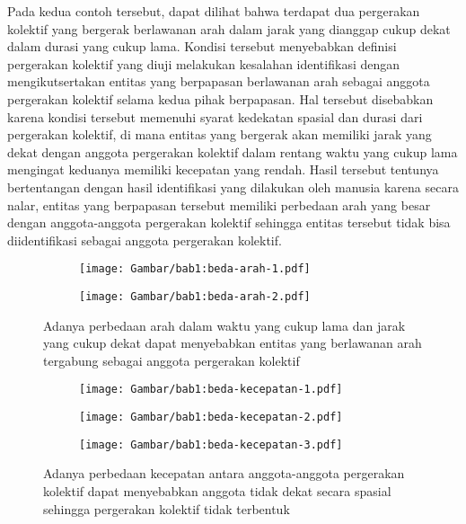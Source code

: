 Pada kedua contoh tersebut, dapat dilihat bahwa terdapat dua pergerakan kolektif yang bergerak berlawanan arah dalam jarak yang dianggap cukup dekat dalam durasi yang cukup lama. Kondisi tersebut menyebabkan definisi pergerakan kolektif yang diuji melakukan kesalahan identifikasi dengan mengikutsertakan entitas yang berpapasan berlawanan arah sebagai anggota pergerakan kolektif selama kedua pihak berpapasan. Hal tersebut disebabkan karena kondisi tersebut memenuhi syarat kedekatan spasial dan durasi dari pergerakan kolektif, di mana entitas yang bergerak akan memiliki jarak yang dekat dengan anggota pergerakan kolektif dalam rentang waktu yang cukup lama mengingat keduanya memiliki kecepatan yang rendah. Hasil tersebut tentunya bertentangan dengan hasil identifikasi yang dilakukan oleh manusia karena secara nalar, entitas yang berpapasan tersebut memiliki perbedaan arah yang besar dengan anggota-anggota pergerakan kolektif sehingga entitas tersebut tidak bisa diidentifikasi sebagai anggota pergerakan kolektif.

\begin{figure}[t]
    \centering
    \captionsetup{width=0.85\textwidth}
    \begin{subfigure}[h]{0.45\textwidth}
        \centering
        \texttt{[image: Gambar/bab1:beda-arah-1.pdf]}
    \end{subfigure} \hspace{0.25cm}
    \begin{subfigure}[h]{0.45\textwidth}
        \centering
        \texttt{[image: Gambar/bab1:beda-arah-2.pdf]}
    \end{subfigure}
    \caption[Masalah perbedaan arah pada identifikasi pergerakan kolektif]{Adanya perbedaan arah dalam waktu yang cukup lama dan jarak yang cukup dekat dapat menyebabkan entitas yang berlawanan arah tergabung sebagai anggota pergerakan kolektif}
    \label{bab1:beda-arah}
\end{figure}

\begin{figure}[t]
    \centering
    \captionsetup{width=0.75\textwidth}
    \begin{subfigure}[h]{0.25\textwidth}
        \centering
        \texttt{[image: Gambar/bab1:beda-kecepatan-1.pdf]}
    \end{subfigure}
    \begin{subfigure}[h]{0.25\textwidth}
        \centering
        \texttt{[image: Gambar/bab1:beda-kecepatan-2.pdf]}
    \end{subfigure}
    \begin{subfigure}[h]{0.25\textwidth}
        \centering
        \texttt{[image: Gambar/bab1:beda-kecepatan-3.pdf]}
    \end{subfigure}
    \caption[Masalah perbedaan kecepatan pada identifikasi pergerakan kolektif]{Adanya perbedaan kecepatan antara anggota-anggota pergerakan kolektif dapat menyebabkan anggota tidak dekat secara spasial sehingga pergerakan kolektif tidak terbentuk}
    \label{bab1:beda-kecepatan}
\end{figure}

